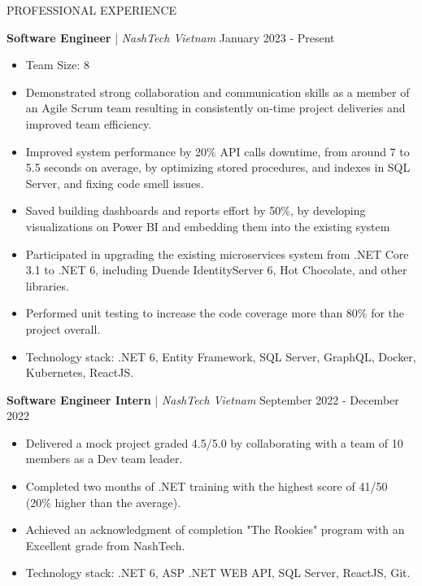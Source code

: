 \begin{rSection}{PROFESSIONAL EXPERIENCE}

    \quad\textbf{Software Engineer} | \textit{NashTech Vietnam} \hfill January 2023 - Present\\
    \begin{itemize}
        \itemsep 0pt {} \vspace{-1em}
        \item Team Size: 8
        \item Demonstrated strong collaboration and communication skills as a member of an Agile Scrum team
              resulting in consistently on-time project deliveries and improved team efficiency.
        \item Improved system performance by 20\% API calls downtime, from around 7 to 5.5 seconds on average,
              by optimizing stored procedures, and indexes in SQL Server, and fixing code smell issues.
        \item Saved building dashboards and reports effort by 50\%, by developing visualizations on Power BI and embedding them into the existing system
        \item Participated in upgrading the existing microservices system from .NET Core 3.1 to .NET 6,
              including Duende IdentityServer 6, Hot Chocolate, and other libraries.
        \item Performed unit testing to increase the code coverage more than 80\% for the project overall.
        \item Technology stack: .NET 6, Entity Framework, SQL Server, GraphQL, Docker, Kubernetes, ReactJS.
    \end{itemize}

    \vspace{1em}

    \quad\textbf{Software Engineer Intern} | \textit{NashTech Vietnam} \hfill September 2022 - December 2022\\
    \begin{itemize}
        \itemsep 0pt {} \vspace{-1em}
        \item Delivered a mock project graded 4.5/5.0 by collaborating with a team of 10 members as a Dev team leader.
        \item Completed two months of .NET training with the highest score of 41/50 (20\% higher than the average).
        \item Achieved an acknowledgment of completion "The Rookies" program with an Excellent grade from NashTech.
        \item Technology stack: .NET 6, ASP .NET WEB API, SQL Server, ReactJS, Git.
    \end{itemize}


\end{rSection}
